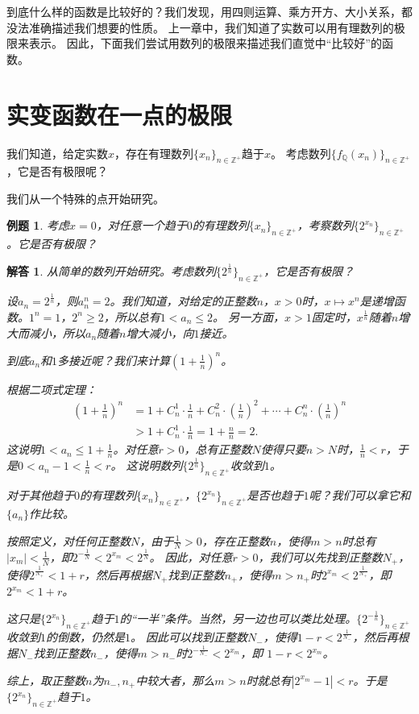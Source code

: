 \documentclass[12pt,UTF8]{ctexbook}
\newtheorem{et}{例题}[section]
\newtheorem*{so}{解答}
\begin{document}
到底什么样的函数是比较好的？我们发现，用四则运算、乘方开方、大小关系，都没法准确描述我们想要的性质。
上一章中，我们知道了实数可以用有理数列的极限来表示。
因此，下面我们尝试用数列的极限来描述我们直觉中“比较好”的函数。

\section{实变函数在一点的极限}
我们知道，给定实数$x$，存在有理数列$\{x_n\}_{n\in\mathbb{Z}^+}$趋于$x$。
考虑数列$\{f_{\mathbb{Q}}(x_n)\}_{n\in\mathbb{Z}^+}$，它是否有极限呢？

我们从一个特殊的点开始研究。
\begin{et}
    考虑$x=0$，对任意一个趋于$0$的有理数列$\{x_n\}_{n\in\mathbb{Z}^+}$，考察数列$\{2^{x_n}\}_{n\in\mathbb{Z}^+}$。它是否有极限？
\end{et}
\begin{so}
    从简单的数列开始研究。考虑数列$\{2^\frac{1}{n}\}_{n\in\mathbb{Z}^+}$，它是否有极限？

    设$a_n = 2^\frac{1}{n}$，则$a_n^n = 2$。我们知道，对给定的正整数$n$，$x>0$时，$x\mapsto x^n$是递增函数。$1^n=1$，$2^n\geqslant 2$，所以总有$1<a_n\leqslant 2$。
    另一方面，$x>1$固定时，$x^\frac{1}{n}$随着$n$增大而减小，所以$a_n$随着$n$增大减小，向$1$接近。

    到底$a_n$和$1$多接近呢？我们来计算$\left(1+\frac{1}{n}\right)^n$。

    根据二项式定理：
    \begin{align*}
        \left(1+\frac{1}{n}\right)^n &= 1 + C_n^1\cdot \frac{1}{n} + C_n^2\cdot \left(\frac{1}{n}\right)^2 + \cdots + C_n^n\cdot \left(\frac{1}{n}\right)^n  \\
        &> 1 + C_n^1\cdot \frac{1}{n} = 1 + \frac{n}{n} = 2. 
    \end{align*}
    这说明$1<a_n\leqslant 1 + \frac{1}{n}$。对任意$r>0$，总有正整数$N$使得只要$n>N$时，$\frac{1}{n}<r$，于是$0 < a_n - 1 < \frac{1}{n} < r$。
    这说明数列$\{2^\frac{1}{n}\}_{n\in\mathbb{Z}^+}$收敛到$1$。

    对于其他趋于$0$的有理数列$\{x_n\}_{n\in\mathbb{Z}^+}$，$\{2^{x_n}\}_{n\in\mathbb{Z}^+}$是否也趋于$1$呢？我们可以拿它和$\{a_n\}$作比较。

    按照定义，对任何正整数$N$，由于$\frac{1}{N}>0$，存在正整数$n$，使得$m>n$时总有$|x_m| < \frac{1}{N}$，即$2^{-\frac{1}{N}} < 2^{x_m} < 2^\frac{1}{N}$。
    因此，对任意$r>0$，我们可以先找到正整数$N_+$，使得$2^{\frac{1}{N_+}} < 1 + r$，然后再根据$N_+$找到正整数$n_+$，使得$m>n_+$时$2^{x_m} < 2^\frac{1}{N_+}$，即
    $2^{x_m} < 1 + r$。

    这只是$\{2^{x_n}\}_{n\in\mathbb{Z}^+}$趋于$1$的“一半”条件。当然，另一边也可以类比处理。$\{2^{-\frac{1}{n}}\}_{n\in\mathbb{Z}^+}$收敛到$1$的倒数，仍然是$1$。
    因此可以找到正整数$N_-$，使得$1 - r < 2^{\frac{1}{N_-}}$，然后再根据$N_-$找到正整数$n_-$，使得$m>n_-$时$2^{-\frac{1}{N_-}} < 2^{x_m}$，即
    $1 - r < 2^{x_m}$。
    
    综上，取正整数$n$为$n_-,n_+$中较大者，那么$m>n$时就总有$\left|2^{x_m} - 1\right| < r$。于是$\{2^{x_n}\}_{n\in\mathbb{Z}^+}$趋于$1$。
\end{so}
\end{document}
